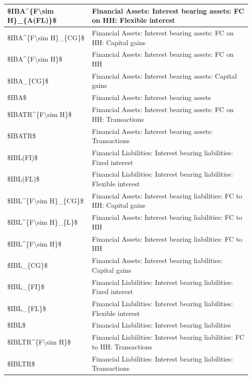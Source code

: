 \documentclass[
]{book}
\begin{document}
\begin{tabular}[t]{l|l}
\hline
\$IBA\textasciicircum{}\{F\textbackslash{}sim H\}\_\{A(FL)\}\$ & Financial Assets: Interest bearing assets: FC on HH: Flexible interest\\
\hline
\$IBA\textasciicircum{}\{F\textbackslash{}sim H\}\_\{CG\}\$ & Financial Assets: Interest bearing assets: FC on HH: Capital gains\\
\hline
\$IBA\textasciicircum{}\{F\textbackslash{}sim H\}\$ & Financial Assets: Interest bearing assets: FC on HH\\
\hline
\$IBA\_\{CG\}\$ & Financial Assets: Interest bearing assets: Capital gains\\
\hline
\$IBA\$ & Financial Assets: Interest bearing assets\\
\hline
\$IBATR\textasciicircum{}\{F\textbackslash{}sim H\}\$ & Financial Assets: Interest bearing assets: FC on HH: Transactions\\
\hline
\$IBATR\$ & Financial Assets: Interest bearing assets: Transactions\\
\hline
\$IBL(FI)\$ & Financial Liabilities: Interest bearing liabilities: Fixed interest\\
\hline
\$IBL(FL)\$ & Financial Liabilities: Interest bearing liabilities: Flexible interest\\
\hline
\$IBL\textasciicircum{}\{F\textbackslash{}sim H\}\_\{CG\}\$ & Financial Assets: Interest bearing liabilities: FC to HH: Capital gains\\
\hline
\$IBL\textasciicircum{}\{F\textbackslash{}sim H\}\_\{L\}\$ & Financial Assets: Interest bearing liabilities: FC to HH\\
\hline
\$IBL\textasciicircum{}\{F\textbackslash{}sim H\}\$ & Financial Assets: Interest bearing liabilities: FC to HH\\
\hline
\$IBL\_\{CG\}\$ & Financial Assets: Interest bearing liabilities: Capital gains\\
\hline
\$IBL\_\{FI\}\$ & Financial Liabilities: Interest bearing liabilities: Fixed interest\\
\hline
\$IBL\_\{FL\}\$ & Financial Liabilities: Interest bearing liabilities: Flexible interest\\
\hline
\$IBL\$ & Financial Liabilities: Interest bearing liabilities\\
\hline
\$IBLTR\textasciicircum{}\{F\textbackslash{}sim H\}\$ & Financial Liabilities: Interest bearing liabilities: FC to HH: Transactions\\
\hline
\$IBLTR\$ & Financial Liabilities: Interest bearing liabilities: Transactions\\

\end{tabular}
\end{document}
